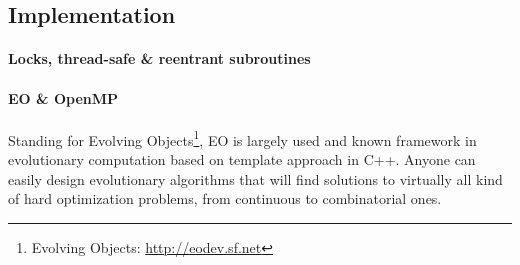 \documentclass{sig-alternate}
\newcommand{\DAEYAHSP}{{\sc DaE$_{\text{YAHSP}}$}}
\begin{document}



\subsection{Implementation}

\paragraph{Locks, thread-safe \& reentrant subroutines} %

\paragraph{EO \& OpenMP} %


Standing for Evolving Objects\footnote{Evolving Objects: \url{http://eodev.sf.net}}, EO is largely used and known framework in evolutionary computation based on template approach in C++. Anyone can easily design evolutionary algorithms that will find solutions to virtually all kind of hard optimization problems, from continuous to combinatorial ones.

\end{document}

